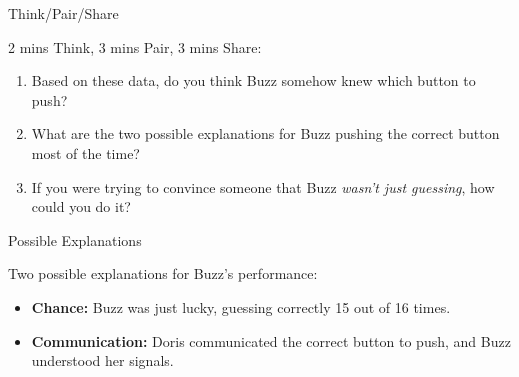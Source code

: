 \documentclass[slidestop,compress,mathserif]{beamer}
\begin{document}
\begin{frame}{Think/Pair/Share}
    \begin{block}{2 mins Think, 3 mins Pair, 3 mins Share:}
        \begin{enumerate}
            \item Based on these data, do you think Buzz somehow knew which button to push?
            \item What are the two possible explanations for Buzz pushing the correct button most of the time?
            \item If you were trying to convince someone that Buzz \emph{wasn't just guessing}, how could you do it?
        \end{enumerate}
    \end{block}
    \vspace{0.6cm}
    \begin{center}
    \end{center}
\end{frame}

\begin{frame}{Possible Explanations}
    \begin{block}{Two possible explanations for Buzz's performance:}
        \begin{itemize}
            \item \textbf{Chance:} Buzz was just lucky, guessing correctly 15 out of 16 times.
            \item \textbf{Communication:} Doris communicated the correct button to push, and Buzz understood her signals.
        \end{itemize}
    \end{block}
\end{frame}
\end{document}
